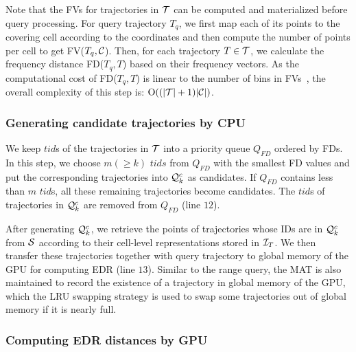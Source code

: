 \documentclass[10pt,conference,letterpaper]{IEEEtran}
\newcommand{\rangeq}{{{\cal Q}_r}\xspace}
\newcommand{\simcand}{{{\cal Q}_k^c}\xspace}
\newcommand{\alltraj}{{{\cal T}}\xspace}
\newcommand{\allcell}{{\cal C}\xspace}
\newcommand{\trajtable}{{\cal S}\xspace}
\newcommand{\trajindex}{{{\cal I}_T}\xspace}
\newcommand{\bigoh}{{\rm O}\xspace}
\begin{document}
Note that the FVs for trajectories in $\alltraj$ can be computed and materialized before query processing. For query trajectory $T_q$, we first map each of its points to the covering cell according to the coordinates and then compute the number of points per cell to get FV($T_q, \allcell$). Then, for each trajectory $T\in\alltraj$, we calculate the frequency distance FD($T_q, T$) based on their frequency vectors.
%
As the computational cost of FD($T_q, T$) is linear to the number of bins in FVs~\cite{DBLP:conf/sigmod/ChenOO05}, the overall complexity of this step is: $\bigoh((|\alltraj|+1)|\allcell|)$.







\subsubsection{Generating candidate trajectories by CPU}
We keep $tid$s of the trajectories in $\alltraj$ into a priority queue ${Q}_{FD}$ ordered by FDs. In this step, we choose $m(\geq k)$  $tids$ from ${Q}_{FD}$ with the smallest FD values and put the corresponding trajectories into $\simcand$ as candidates. If ${Q}_{FD}$ contains less than $m$ $tid$s, all these remaining trajectories become candidates. The $tid$s of trajectories in $\simcand$ are removed from ${Q}_{FD}$ (line $12$).

After generating $\simcand$, we retrieve the points of trajectories whose IDs are in $\simcand$ from $\trajtable$ according to their cell-level representations stored in $\trajindex$. We then transfer these trajectories together with query trajectory to global memory of the GPU for computing EDR (line $13$).
Similar to the range query, the MAT is also maintained to record the existence of a trajectory in global memory of the GPU, which the LRU swapping strategy is used to swap some trajectories out of global memory if it is nearly full.




\subsubsection{Computing EDR distances by GPU}
\end{document}
